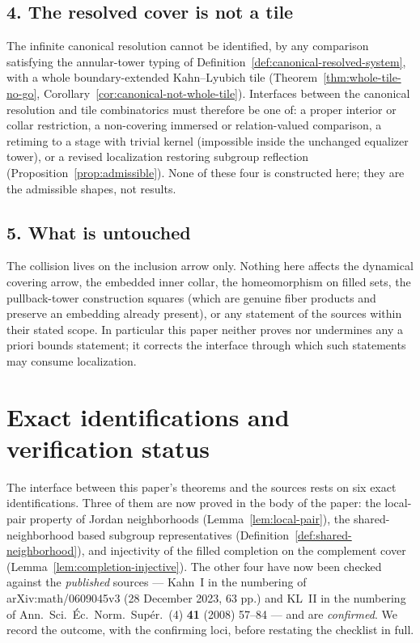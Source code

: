 \documentclass[11pt,reqno]{amsart}
\theoremstyle{definition}
\theoremstyle{remark}
\begin{document}
\subsection*{4. The resolved cover is not a tile}
The infinite canonical resolution cannot be identified, by any
comparison satisfying the annular-tower typing of
Definition~\ref{def:canonical-resolved-system}, with a whole
boundary-extended Kahn--Lyubich tile
(Theorem~\ref{thm:whole-tile-no-go},
Corollary~\ref{cor:canonical-not-whole-tile}).  Interfaces between the
canonical resolution and tile combinatorics must therefore be one of:
a proper interior or collar restriction, a non-covering immersed or
relation-valued comparison, a retiming to a stage with trivial kernel
(impossible inside the unchanged equalizer tower), or a revised
localization restoring subgroup reflection
(Proposition~\ref{prop:admissible}).  None of these four is
constructed here; they are the admissible shapes, not results.

\subsection*{5. What is untouched}
The collision lives on the inclusion arrow only.  Nothing here affects
the dynamical covering arrow, the embedded inner collar, the
homeomorphism on filled sets, the pullback-tower construction squares
(which are genuine fiber products and preserve an embedding already
present), or any statement of the sources within their stated scope.
In particular this paper neither proves nor undermines any a priori
bounds statement; it corrects the interface through which such
statements may consume localization.

\section{Exact identifications and verification status}
\label{sec:verification}

The interface between this paper's theorems and the sources rests on
six exact identifications.  Three of them are now proved in the body of
the paper: the local-pair property of Jordan neighborhoods
(Lemma~\ref{lem:local-pair}), the shared-neighborhood based subgroup
representatives (Definition~\ref{def:shared-neighborhood}), and
injectivity of the filled completion on the complement cover
(Lemma~\ref{lem:completion-injective}).  The other four have now been
checked against the \emph{published} sources --- Kahn~I in the
numbering of arXiv:math/0609045v3 (28 December 2023, 63 pp.) and KL~II
in the numbering of Ann.\ Sci.\ \'Ec.\ Norm.\ Sup\'er.\ (4)
\textbf{41} (2008) 57--84 --- and are \emph{confirmed}.  We record the
outcome, with the confirming loci, before restating the checklist in
full.
\end{document}
